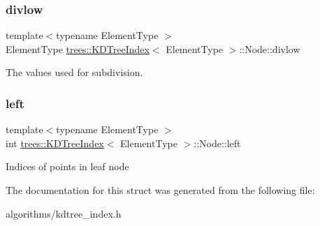 \subsubsection{\texorpdfstring{divlow}{divlow}}
{\footnotesize\ttfamily template$<$typename Element\+Type $>$ \\
Element\+Type \hyperlink{classtrees_1_1_k_d_tree_index}{trees\+::\+K\+D\+Tree\+Index}$<$ Element\+Type $>$\+::Node\+::divlow}

The values used for subdivision. \mbox{\label{structtrees_1_1_k_d_tree_index_1_1_node_aae063499d92e644cfc075f9c151b185b}} 
\subsubsection{\texorpdfstring{left}{left}}
{\footnotesize\ttfamily template$<$typename Element\+Type $>$ \\
int \hyperlink{classtrees_1_1_k_d_tree_index}{trees\+::\+K\+D\+Tree\+Index}$<$ Element\+Type $>$\+::Node\+::left}

Indices of points in leaf node 

The documentation for this struct was generated from the following file\+:\begin{DoxyCompactItemize}
\item 
algorithms/kdtree\+\_\+index.\+h\end{DoxyCompactItemize}
